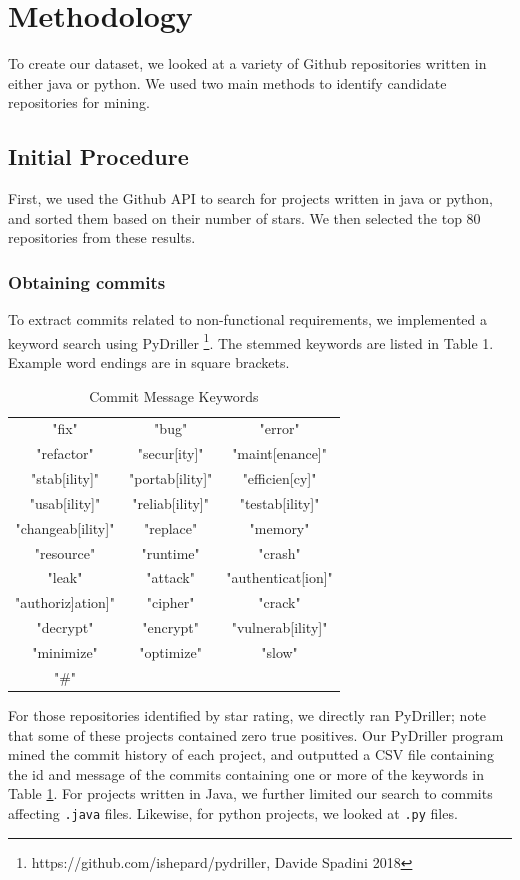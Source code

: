 \documentclass[sigconf]{acmart}
\begin{document}
\section{Methodology}
To create our dataset, we looked at a variety of Github repositories written in either java or python. 
We used two main methods to identify candidate repositories for mining. 
 
\subsection{Initial Procedure}
First, we used the Github API to search for projects written in java or python, and sorted them based on their number of stars. We then selected the top 80 repositories from these results. 

\subsubsection{Obtaining commits}
To extract commits related to non-functional requirements, we implemented a keyword search using PyDriller \footnote{https://github.com/ishepard/pydriller, Davide Spadini 2018}. The stemmed keywords are listed in Table 1. Example word endings are in square brackets.

\begin{table}
  \caption{Commit Message Keywords}
  \label{tab:kwds}
\begin{tabular}{  c c c }
\toprule
 "fix"&"bug"&"error"\\
 "refactor"&"secur[ity]" &"maint[enance]"\\
 "stab[ility]"&"portab[ility]"&"efficien[cy]"\\
 "usab[ility]" & "reliab[ility]"&"testab[ility]"\\
 "changeab[ility]"& "replace"&"memory"\\
 "resource"& "runtime"&"crash"\\
 "leak" &"attack" &"authenticat[ion]"\\
 "authoriz]ation]"& "cipher"&"crack" \\ 
 "decrypt"&"encrypt"&"vulnerab[ility]"\\ 
 "minimize"&"optimize"&"slow"\\
 "\#"& &\\
\bottomrule
\end{tabular}
\end{table}

For those repositories identified by star rating, we directly ran PyDriller; note that some of these projects contained zero true positives. 
Our PyDriller program mined the commit history of each project, and outputted a CSV file containing the id and message of the commits containing one or more of the keywords in Table \ref{tab:kwds}. For projects written in Java, we further limited our search to commits affecting \texttt{.java} files. Likewise, for python projects, we looked at \texttt{.py} files.
\end{document}
